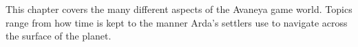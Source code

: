 

This chapter covers the many different aspects of the Avaneya game world. Topics range from how time is kept to the manner Arda's settlers use to navigate across the surface of the planet.

%
%
%
%
%
%
%
%
%
%
%
%
%

%

\StopChapter

